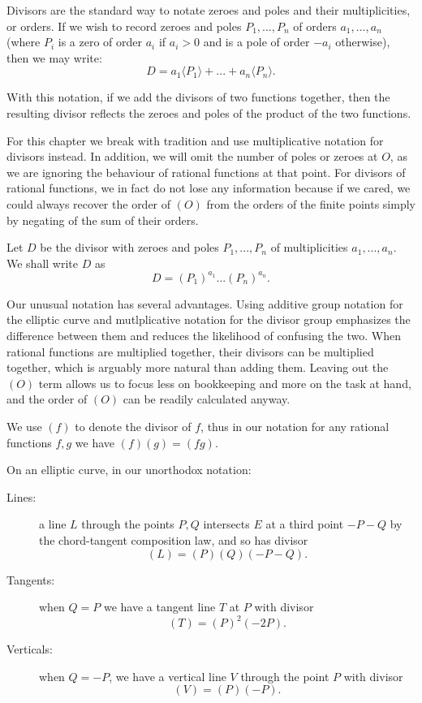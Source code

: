 Divisors are the standard way
to notate zeroes and poles and their multiplicities, or orders.
If we wish to record zeroes and poles $P_1,...,P_n$
of orders $a_1,...,a_n$ (where $P_i$ is a zero of order
$a_i$ if $a_i > 0$ and is a pole of order $-a_i$ otherwise), then
we may write:
\[ D = a_1\langle P_1\rangle + ... + a_n \langle P_n\rangle .\]

With this notation, if we add the divisors of two functions together,
then the resulting divisor reflects the zeroes and poles of the product
of the two functions.

For this chapter we break with tradition and use multiplicative
notation for divisors instead. In addition, we will omit the
number of poles or zeroes at $O$, as we are ignoring the behaviour of
rational functions at that point.
For divisors of rational functions, we in fact do not lose any information 
because if we cared,
we could always recover the order of $(O)$
from the orders of the finite points
simply by negating of the sum of their orders.

Let $D$ be the divisor with zeroes and poles $P_1,...,P_n$
of multiplicities $a_1,...,a_n$.
We shall write $D$ as
\[ D = (P_1)^{a_1} ... (P_n)^{a_n} . \]

Our unusual notation has several advantages. Using additive group
notation for the elliptic curve and mutlplicative notation for the divisor
group emphasizes the difference between them and reduces the likelihood of
confusing the two. When rational functions are multiplied together,
their divisors can be multiplied together, which is arguably
more natural than adding them.
Leaving out the $(O)$ term allows us to focus less on
bookkeeping and more on the task at hand,
and the order of $(O)$ can be readily calculated anyway.

We use $(f)$ to denote the divisor of $f$, thus in our notation
for any rational functions $f, g$ we have $(f)(g) = (f g)$.

On an elliptic curve, in our unorthodox notation:
\begin{description}
\item[Lines:]
a line $L$ through the points $P, Q$ intersects $E$ at a third point
$-P-Q$ by the chord-tangent composition law, and so has divisor
\[ (L) = (P)(Q)(-P-Q) . \]
\item[Tangents:]
when $Q = P$ we have a tangent line $T$ at $P$ with divisor
\[ (T) = (P)^2 (-2P) . \]
\item[Verticals:]
when $Q = -P$, we have a vertical line $V$ through the point $P$
with divisor
\[ (V) = (P)(-P) . \]
\end{description}

